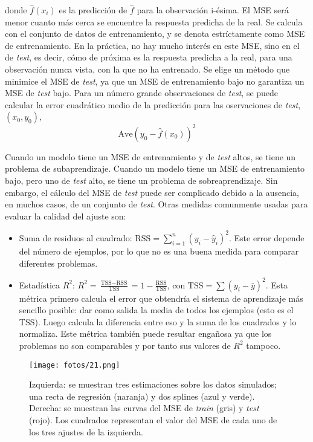 \noindent donde $\hat{f}(x_i)$ es la predicción de $\hat{f}$ para la observación i-ésima. El MSE será menor cuanto más cerca se encuentre la respuesta predicha de la real. Se calcula con el conjunto de datos de entrenamiento, y se denota estríctamente como MSE de entrenamiento. En la práctica, no hay mucho interés en este MSE, sino en el de \textit{test}, es decir, cómo de próxima es la respuesta predicha a la real, para una observación nunca vista, con la que no ha entrenado. Se elige un método que minimice el MSE de \textit{test}, ya que un MSE de entrenamiento bajo no garantiza un MSE de \textit{test} bajo. Para un número grande observaciones de \textit{test}, se puede calcular la error cuadrático medio de la predicción para las oservaciones de \textit{test}, $(x_0, y_0)$, 
\begin{equation}
\text{Ave}(y_0 - \hat{f}(x_0))^2
\end{equation}

Cuando un modelo tiene un MSE de entrenamiento y de \textit{test} altos, se tiene un problema de subaprendizaje. Cuando un modelo tiene un MSE de entrenamiento bajo, pero uno de \textit{test} alto, se tiene un problema de sobreaprendizaje. Sin embargo, el cálculo del MSE de \textit{test} puede ser complicado debido a la ausencia, en muchos casos, de un conjunto de \textit{test}. Otras medidas comunmente usadas para evaluar la calidad del ajuste son:
\begin{itemize}
\item Suma de residuos al cuadrado: $\text{RSS} = \sum_{i = 1}^n (y_i - \hat{y}_i)^2$. Este error depende del número de ejemplos, por lo que no es una buena medida para comparar diferentes problemas.
\item Estadística $R^2$: $R^2 = \frac{\text{TSS} - \text{RSS}}{\text{TSS}} = 1 - \frac{\text{RSS}}{\text{TSS}}$, con $\text{TSS} = \sum (y_i - \bar{y})^2$. Esta métrica primero calcula el error que obtendría el sistema de aprendizaje más sencillo posible: dar como salida la media de todos los ejemplos (esto es el TSS). Luego calcula la diferencia entre eso y la suma de los cuadrados y lo normaliza. Este métrica también puede resultar engañosa ya que los problemas no son comparables y por tanto sus valores de $R^2$ tampoco.
\end{itemize}

\begin{figure}[h]
\centering
\texttt{[image: fotos/21.png]}
\caption{Izquierda: se muestran tres estimaciones sobre los datos simulados; una recta de regresión (naranja) y dos splines (azul y verde). Derecha: se muestran las curvas del MSE de \textit{train} (gris) y \textit{test} (rojo). Los cuadrados representan el valor del MSE de cada uno de los tres ajustes de la izquierda.}
\label{fig:4.1}
\end{figure}

